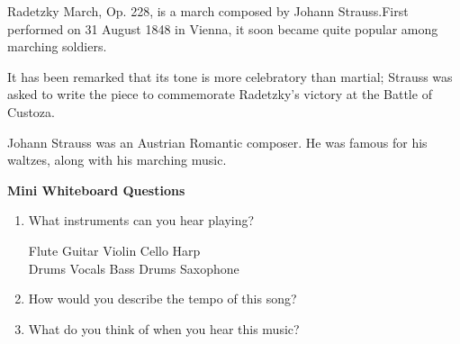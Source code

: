 \documentclass{article}
\begin{document}
\noindent Radetzky March, Op. 228, is a march composed by Johann Strauss.First performed on 31 August 1848 in Vienna, it soon became quite popular among marching soldiers. 

\par \noindent It has been remarked that its tone is more celebratory than martial; Strauss was asked to write the piece to commemorate Radetzky's victory at the Battle of Custoza.
\par \noindent Johann Strauss was an Austrian Romantic composer. He was famous for his waltzes, along with his marching music. 




\vspace{2em}

\begin{tcolorbox}[width=\textwidth]
\noindent\textbf{Mini Whiteboard Questions}

\vspace{1em}

\begin{enumerate}[leftmargin=1em, itemsep=0pt, parsep=0pt, topsep=0pt]
    \item What instruments can you hear playing? 
    \vspace{1em}

    \begin{flushleft}
        Flute  \hfill Guitar  \hfill Violin \hfill Cello \hfill Harp \\
        \vspace{1em}
     Drums  \hfill Vocals  \hfill Bass \hfill Drums \hfill Saxophone \\
    
    \end{flushleft}
    \vspace{1em}
    \item How would you describe the tempo of this song?
    \vspace{2em}
    
    \item What do you think of when you hear this music?


    \vspace{2em}
    

\end{enumerate}
\end{tcolorbox}
\newpage
\end{document}
